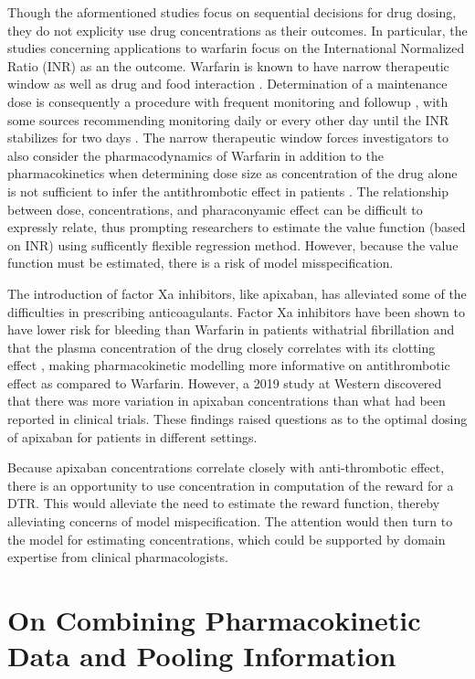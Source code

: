 Though the aformentioned studies focus on sequential decisions for drug dosing, they do not explicity use drug concentrations as their outcomes. In particular, the studies concerning applications to warfarin focus on the International Normalized Ratio (INR) as an the outcome. Warfarin is known to have narrow therapeutic window \needscite as well as drug and food interaction \needscite. Determination of a maintenance dose is consequently a procedure with frequent monitoring and followup \needscite, with some sources recommending monitoring daily or every other day until the INR stabilizes for two days \needscite. The narrow therapeutic window forces investigators to also consider the pharmacodynamics of Warfarin in addition to the pharmacokinetics when determining dose size as concentration of the drug alone is not sufficient to infer the antithrombotic effect in patients \needscite. The relationship between dose, concentrations, and pharaconyamic effect can be difficult to expressly relate, thus prompting researchers to estimate the value function (based on INR) using sufficently flexible regression method. However, because the value function must be estimated, there is a risk of model misspecification.

The introduction of factor Xa inhibitors, like apixaban, has alleviated some of the difficulties in prescribing anticoagulants. Factor Xa inhibitors have been shown to have lower risk for bleeding than Warfarin in patients withatrial fibrillation \needscite and that the plasma concentration of the drug closely correlates with its clotting effect \cite{Byon2019-gf}, making pharmacokinetic modelling more informative on antithrombotic effect as compared to Warfarin. However, a 2019 study at Western \cite{sukumar2019apixaban} discovered that there was more variation in apixaban concentrations than what had been reported in clinical trials.  These findings raised questions as to the optimal dosing of apixaban for patients in different settings.

Because apixaban concentrations correlate closely with anti-thrombotic effect, there is an opportunity to use concentration in computation of the reward for a DTR.  This would alleviate the need to estimate the reward function, thereby alleviating concerns of model mispecification.  The attention would then turn to the model for estimating concentrations, which could be supported by domain expertise from clinical pharmacologists.



\section{On Combining Pharmacokinetic Data and Pooling Information}